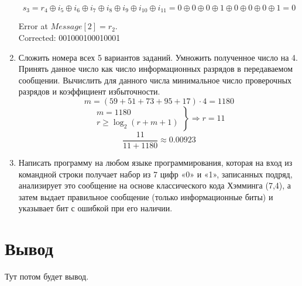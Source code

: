 \documentclass{article}
\begin{document}
\begin{enumerate}
$$        $$
        $$
          s_3 = r_4 \oplus i_5 \oplus i_6 \oplus i_7 \oplus i_8 \oplus i_9 \oplus i_{10} \oplus i_{11} = 0\oplus0\oplus0\oplus1\oplus0\oplus0\oplus0\oplus1 = 0
        $$
        \begin{center}
          Error at $Message[2]=r_2$.\\
          Corrected: 001000100010001
        \end{center}
  \item  Сложить номера всех 5 вариантов заданий. Умножить полученное число
        на 4. Принять данное число как число информационных разрядов в
        передаваемом сообщении. Вычислить для данного числа минимальное
        число проверочных разрядов и коэффициент избыточности. $$ m = (59 + 51 + 73 + 95 + 17) \cdot 4 = 1180 $$
        $$ \left. \begin{array}{rr}
            m = 1180 \\
            r \geq \log_2(r+m+1)
          \end{array} \right\} \Rightarrow r = 11$$
        $$\frac{11}{11+1180} \approx 0.00923$$
  \item Написать программу на любом языке программирования,
        которая на вход из командной строки получает набор из 7 цифр «0» и «1»,
        записанных подряд, анализирует это сообщение на основе классического
        кода Хэмминга (7,4), а затем выдает правильное сообщение (только
        информационные биты) и указывает бит с ошибкой при его наличии. 
        
\end{enumerate}


\section*{Вывод}
Тут потом будет вывод.
\end{document}

